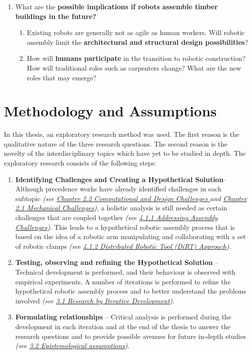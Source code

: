 \documentclass[11pt]{book}
\begin{document}
\begin{enumerate}
\begin{enumerate}
\end{enumerate}
	\item What are the \textbf{possible implications if robots assemble timber buildings in the future?}

\begin{enumerate}
	\item Existing robots are generally not as agile as human workers. Will robotic assembly limit the \textbf{architectural and structural design possibilities}?

	\item How will \textbf{humans participate} in the transition to robotic construction? How will traditional roles such as carpenters change? What are the new roles that may emerge?

\end{enumerate}
\end{enumerate}

\newpage

\section{Methodology and Assumptions}

In this thesis, an exploratory research method was used. The first reason is the qualitative nature of the three research questions. The second reason is the novelty of the interdisciplinary topics which have yet to be studied in depth. The exploratory research consists of the following steps:

\begin{enumerate}
	\item \textbf{Identifying Challenges and Creating a Hypothetical Solution}– Although precedence works have already identified challenges in each subtopic \textit{(see \uline{Chapter 2.2 Computational and Design Challenges }and \uline{Chapter 2.1 Mechanical Challenges})}, a holistic analysis is still needed as certain challenges that are coupled together \textit{(see \uline{4.1.1 Addressing Assembly Challenges})}. This leads to a hypothetical robotic assembly process that is based on the idea of a robotic arm manipulating and collaborating with a set of robotic clamps \textit{(see \uline{4.1.2 Distributed Robotic Tool (DiRT) Approach})}.

	\item \textbf{Testing, observing and refining the Hypothetical Solution} – Technical development is performed, and their behaviour is observed with empirical experiments. A number of iterations is performed to refine the hypothetical robotic assembly process and to better understand the problems involved \textit{(see \uline{3.1 Research by Iterative Development})}.

	\item \textbf{Formulating relationships }– Critical analysis is performed during the development in each iteration and at the end of the thesis to answer the research questions and to provide possible avenues for future in-depth studies \textit{(see \uline{3.2 Epistemological assumptions})}.

\end{enumerate}
\end{document}
